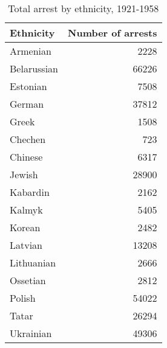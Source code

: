 \begin{table}

\caption{\label{tab:}Total arrest by ethnicity, 1921-1958}
\centering
\begin{tabular}[t]{lr}
\toprule
Ethnicity & Number of arrests\\
\midrule
Armenian & 2228\\
Belarussian & 66226\\
Estonian & 7508\\
German & 37812\\
Greek & 1508\\
\addlinespace
Chechen & 723\\
Chinese & 6317\\
Jewish & 28900\\
Kabardin & 2162\\
Kalmyk & 5405\\
\addlinespace
Korean & 2482\\
Latvian & 13208\\
Lithuanian & 2666\\
Ossetian & 2812\\
Polish & 54022\\
\addlinespace
Tatar & 26294\\
Ukrainian & 49306\\
\bottomrule
\end{tabular}
\end{table}